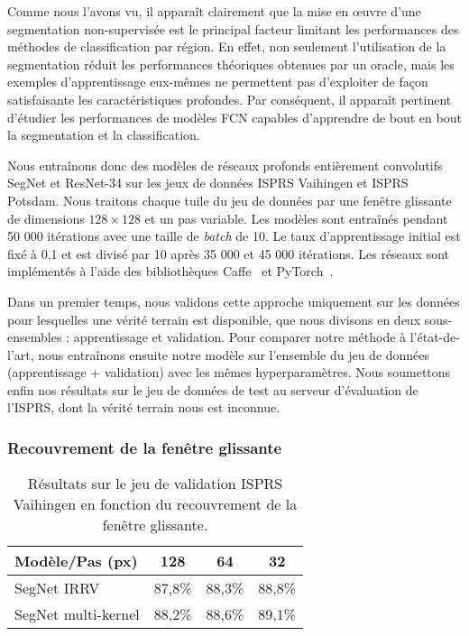Comme nous l'avons vu, il apparaît clairement que la mise en \oe{}uvre d'une segmentation non-supervisée est le principal facteur limitant les performances des méthodes de classification par région. En effet, non seulement l'utilisation de la segmentation réduit les performances théoriques obtenues par un oracle, mais les exemples d'apprentissage eux-mêmes ne permettent pas d'exploiter de façon satisfaisante les caractéristiques profondes. Par conséquent, il apparaît pertinent d'étudier les performances de modèles \gls{FCN} capables d'apprendre de bout en bout la segmentation et la classification.

Nous entraînons donc des modèles de réseaux profonds entièrement convolutifs SegNet et ResNet-34 sur les jeux de données \gls{ISPRS} Vaihingen et \gls{ISPRS} Potsdam.
Nous traitons chaque tuile du jeu de données par une fenêtre glissante de dimensions $128 \times 128$ et un pas variable. Les modèles sont entraînés pendant 50 000 itérations avec une taille de \emph{batch} de 10. Le taux d'apprentissage initial est fixé à 0,1 et est divisé par 10 après 35 000 et 45 000 itérations.
Les réseaux sont implémentés à l'aide des bibliothèques \gls{Caffe}~\cite{jia_caffe_2014} et \gls{PyTorch}~\cite{noauthor_pytorch_2016}.

Dans un premier temps, nous validons cette approche uniquement sur les données pour lesquelles une vérité terrain est disponible, que nous divisons en deux sous-ensembles : apprentissage et validation. Pour comparer notre méthode à l'état-de-l'art, nous entraînons ensuite notre modèle sur l'ensemble du jeu de données (apprentissage + validation) avec les mêmes hyperparamètres. Nous soumettons enfin nos résultats sur le jeu de données de test au serveur d'évaluation de l'\gls{ISPRS}, dont la vérité terrain nous est inconnue.

\subsubsection{Recouvrement de la fenêtre glissante}

\begin{table}[t]
  \centering
  \caption{Résultats sur le jeu de validation \gls{ISPRS} Vaihingen en fonction du recouvrement de la fenêtre glissante.}
  \setlength{\tabcolsep}{4pt}
  \begin{tabularx}{0.8\textwidth}{ Y c c c }
  \toprule
  Modèle/Pas (px) & 128 & 64 & 32\\
  \midrule
  SegNet \gls{IRRV} & 87,8\% & 88,3\% & 88,8\%\\
  SegNet multi-kernel & 88,2\% & 88,6\% & 89,1\%\\
  \bottomrule
  \end{tabularx}
  \label{tab:vaihingen_stride}
\end{table}

